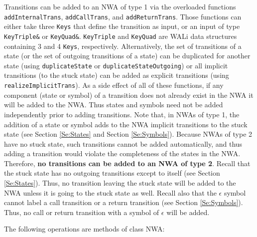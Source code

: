 \documentclass{llncs}
\begin{document}
Transitions can be added to an NWA of type 1 via the overloaded functions
\texttt{addInternalTrans}, \texttt{addCallTrans}, and
\texttt{addReturnTrans}.  Those functions can either take three \texttt{Keys}
that define the transition as input, or an input of type \texttt{KeyTriple\&}
or \texttt{KeyQuad\&}.  \texttt{KeyTriple} and \texttt{KeyQuad} are WALi data
structures containing 3 and 4 \texttt{Keys}, respectively.  Alternatively,
the set of transitions of a state (or the set of outgoing transitions of a
state) can be duplicated for another state (using \texttt{duplicateState} or
\texttt{duplicateStateOutgoing}) or all implicit transitions (to the stuck
state) can be added as explicit transitions (using
\texttt{realizeImplicitTrans}).  As a side effect of all of these functions,
if any component (state or symbol) of a transition does not already exist in
the NWA it will be added to the NWA.  Thus states and symbols need not be
added independently prior to adding transitions.  Note that, in NWAs of type
1, the addition of a state or symbol adds to the NWA implicit transitions to
the stuck state (see Section \ref{Se:States} and Section \ref{Se:Symbols}).
Because NWAs of type 2 have no stuck state, such transitions cannot be added
automatically, and thus adding a transition would violate the completeness of
the states in the NWA.  Therefore, \textbf{no transitions can be added to an
  NWA of type 2}.  Recall that the stuck state has no outgoing transitions
except to itself (see Section \ref{Se:States}).  Thus, no transition leaving
the stuck state will be added to the NWA unless it is going to the stuck
state as well.  Recall also that the \texttt{$\epsilon$} symbol cannot label
a call transition or a return transition (see Section \ref{Se:Symbols}).
Thus, no call or return transition with a symbol of \texttt{$\epsilon$} will
be added. \\

\clearpage

\noindent The following operations are methods of class NWA:
\end{document}
